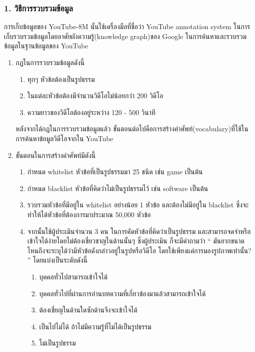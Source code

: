 \subsubsection*{1. วิธีการรวบรวมข้อมูล}
การเก็บข้อมูลของ YouTube-8M นั้นใช้เครื่องมือที่ชื่อว่า YouTube annotation system ในการเก็บรวบรวมข้อมูลโดยอาศัยผังความรู้(knowledge graph)ของ Google ในการค้นหาและรวบรวมข้อมูลในฐานข้อมูลของ YouTube
\begin{enumerate}
	\setlength\itemsep{-0.25em}
	\item กฏในการรวบรวมข้อมูลดังนี้
	\begin{enumerate}
		\setlength\itemsep{-0.25em}
		\item ทุกๆ หัวข้อต้องเป็นรูปธรรม
		\item ในแต่ละหัวข้อต้องมีจำนวนวิดีโอไม่น้อยกว่า 200 วิดีโอ
		\item ความยาวของวิดีโอต้องอยู่ระหว่าง 120 - 500 วินาที
	\end{enumerate}
หลังจากได้กฏในการรวบรวมข้อมูลแล้ว ขั้นตอนต่อไปคือการสร้างคำศัพท์(vocabulary)ที่ใช้ในการค้นหาข้อมูลวิดีโอจากใน YouTube 
	\item ขั้นตอนในการสร้างคำศัพท์มีดังนี้
	\begin{enumerate}
		\setlength\itemsep{-0.25em}
		\item กำหนด whitelist หัวข้อที่เป็นรูปธรรมมา 25 ชนิด เช่น game เป็นต้น
		\item กำหนด blacklist หัวข้อที่คิดว่าไม่เป็นรูปธรรมไว้ เช่น software เป็นต้น
		\item รวบรวมหัวข้อที่มีอยู่ใน whitelist อย่างน้อย 1 หัวข้อ และต้องไม่มีอยู่ใน blacklist ซึ่งจะทำให้ได้หัวข้อที่ต้องการมาประมาณ 50,000 หัวข้อ
		\item จากนั้นใช้ผู้ประเมินจำนวน 3 คน ในการคัดหัวข้อที่คิดว่าเป็นรูปธรรม และสามารถจดจำหรือเข้าใจได้ง่ายโดยไม่ต้องเชี่ยวชาญในด้านนั้นๆ ซึ่งผู้ประเมิน ก็จะมีคำถามว่า “ มันยากขนาดไหนถึงจะระบุได้ว่ามีหัวข้อดังกล่าวอยู่ในรูปหรือวิดีโอ โดยใช้เพียงแค่การมองรูปภาพเท่านั้น? ” โดยแบ่งเป็นระดับดังนี้
		\begin{enumerate}
			\setlength\itemsep{-0.25em}
			\item บุคคลทั่วไปสามารถเข้าใจได้
			\item บุคคลทั่วไปที่ผ่านการอ่านบทความที่เกี่ยวข้องมาแล้วสามารถเข้าใจได้
			\item ต้องเชี่ยญในด้านใดซักด้านจึงจะเข้าใจได้
			\item เป็นไปไม่ได้ ถ้าไม่มีความรู้ที่ไม่ได้เป็นรูปธรรม
			\item ไม่เป็นรูปธรรม
		\end{enumerate}

\end{enumerate}
\end{enumerate}
